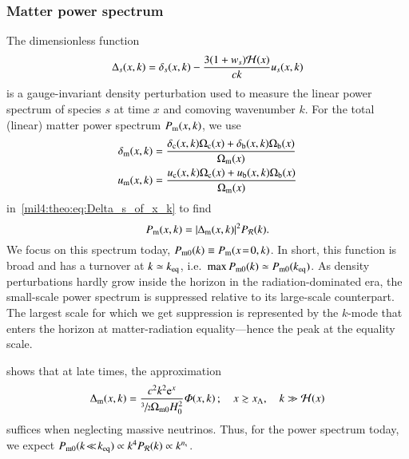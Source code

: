 \subsubsection{Matter power spectrum}
    The dimensionless function
    \begin{equation}\label{mil4:theo:eq:Delta_s_of_x_k}
        \Delta_s (x,k) = \delta_s(x,k) - \frac{3(1+w_s)\Hp(x)}{ck}u_s(x,k)
    \end{equation}
    is a gauge-invariant density perturbation used to measure the linear power spectrum of species $s$ at time $x$ and comoving wavenumber $k$. For the total (linear) matter power spectrum $P\ped{m}(x,k)$, we use
    \begin{equation}
    \begin{split}
        \delta\ped{m}(x,k) &= \frac{\delta\ped{c}(x,k) \Omega\ped{c}(x) + \delta\ped{b}(x,k) \Omega\ped{b}(x)}{\OmgM[](x)} \\
        u\ped{m}(x,k) &= \frac{u\ped{c}(x,k) \Omega\ped{c}(x) + u\ped{b}(x,k) \Omega\ped{b}(x)}{\OmgM[](x)}
    \end{split}
    \end{equation}
    in~\cref{mil4:theo:eq:Delta_s_of_x_k} to find
    \begin{equation}\label{mil4:theo:eq:matter_power_spectrum}
        P\ped{m}(x,k) = \abs{\Delta\ped{m}(x,k)}^2 P_\mathcal{R}(k).
    \end{equation}
    We focus on this spectrum today, $P\ped{m0}(k) \equiv P\ped{m}(x\!=\!0,k)$. In short, this function is broad and has a turnover at $k\simeq k\ped{eq}$, i.e.~$\max{P\ped{m0}(k)} \simeq P\ped{m0}(k\ped{eq})$. As density perturbations hardly grow inside the horizon in the radiation-dominated era, the small-scale power spectrum is suppressed relative to its large-scale counterpart. The largest scale for which we get suppression is represented by the $k$-mode that enters the horizon at matter-radiation equality---hence the peak at the equality scale.

    \citet{DodelsonBook} shows that at late times, the approximation
    \begin{equation}\label{mil4:theo:eq:dimless_matter_power_spectrum}
        \Delta\ped{m}(x,k) = \frac{c^2k^2 \eu[x]}{\sfrac{3}{2} \OmgM H_0^2 } \Phi(x,k)\,; \quad x \gtrsim x\ped{\Lambda} ,\quad  k \gg \Hp(x)
    \end{equation}
    suffices when neglecting massive neutrinos. Thus, for the power spectrum today, we expect $P\ped{m0}(k\!\ll\!k\ped{eq}) \propto k^4P_\mathcal{R}(k) \propto k^{\ns}$. 

